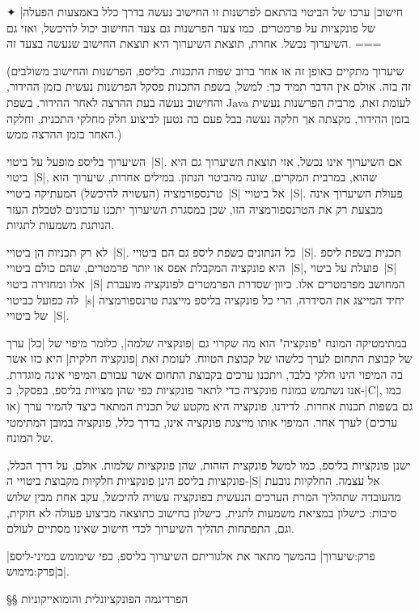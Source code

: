 ✦ \ע|חישוב| ערכו של הביטוי בהתאם לפרשנות זו החישוב נעשה בדרך כלל באמצעות הפעלה
של פונקציות על פרמטרים. כמו צעד הפרשנות גם צעד החישוב יכול להיכשל, ואזי גם
השיערוך נכשל. אחרת, תוצאת השיערוך היא תוצאת החישוב שנעשה בצעד זה.
===

(שיערוך מתקיים באופן זה או אחר ברוב שפות התכנות. בליספ, הפרשנות והחישוב
משולבים זה בזה. אולם אין הדבר תמיד כך: למשל, בשפת התכנות פסקל הפרשנות נעשית
בזמן ההידור, והחישוב נעשה בעת ההרצה לאחר ההידור. בשפת Java לעומת זאת, מרבית
הפרשנות נעשית בזמן ההידור, מקצתה אך חלקה נעשה בבל פעם בה נטען לביצוע חלק מחלקי
התכנית, וחלקה האחר בזמן ההרצה ממש.)

השיערוך בליספ מופעל על ביטוי~\E|S|. אם השיערוך אינו נכשל, אזי תוצאת השיערוך גם
היא ביטוי~\E|S|, שהוא, במרבית המקרים, שונה מהביטוי הנתון. במילים אחרות, שיערוך
הוא טרנספורמציה (העשויה להיכשל) המעתיקה ביטויי~\E|S| אל ביטויי~\E|S|. פעולת
השיערוך אינה מבצעת רק את הטרנספורמציה הזו, שכן במסגרת השיערוך יתכנו עדכונים
לטבלת העזר הנותנת משמעות לתגיות.

לא רק תכניות הן ביטויי~\E|S|. כל הנתונים בשפת ליספ גם הם ביטויי~\E|S|. תכנית
בשפת ליספ היא פונקציה המקבלת אפס או יותר פרמטרים, שהם כולם ביטויי~\E|S|, פועלת
על ביטוי~\E|S| אלו ומחזירה ביטוי~\E|S| המחושב מפרמטרים אלו. כיוון שסדרת
הפרמטרים לפונקציה מועברת לה כפועל כביטוי~\E|s| יחיד המייצג את הסידרה, הרי כל
פונקציה בליספ מייצגת טרנספורמציה של ביטויי~\E|S|.

במתימטיקה המונח "פונקציה" הוא מה שקרוי גם \ע|פונקציה שלמה|, כלומר מיפוי של
\ע|כל| ערך של קבוצת התחום לערך כלשהו של קבוצת הטווח. לעומת זאת \ע|פונקציה
חלקית| היא כזו אשר בה המיפוי הינו חלקי בלבד, ויתכנו ערכים בקבוצת התחום אשר
עבורם המיפוי אינה מוגדרת. אנו נשתמש במונח פונקציה כדי לתאר פונקציות כפי שהן
מצויות בליספ, בפסקל, ב-\E|C|, כמו גם בשפות תכנות אחרות. לדידנו, פונקציה היא
מקטע של תכנית המתאר כיצד להמיר ערך (או ערכים) לערך אחר. המיפוי אותו מייצגת
פונקציה אינו, בדרך כלל, פונקציה במובן המתימטי של המונח.

ישנן פונקציות בליספ, כמו למשל פונקצית הזהות, שהן פונקציות שלמות. אולם, על דרך
הכלל, פונקציות בליספ הינן פונקציות חלקיות מקבוצת ביטויי ה-\E|S| אל עצמה.
החלקיות נובעת מהעובדה שתהליך המרת הערכים הנעשית בפונקציה עשויה להיכשל, עקב אחת
מבין שלוש סיבות: כישלון במציאת משמעות לתגית, כישלון בחישוב כתוצאה מביצוע פעולה
לא חוקית, וגם, התפתחות תהליך השיערוך לכדי חישוב שאינו מסתיים לעולם.

|פרק:שיערוך| בהמשך מתאר את אלגוריתם השיערוך בליספ, כפי שימומש
במיני-ליספ ב|פרק:מימוש|.

§§ הפרדיגמה הפונקציונלית והומואייקוניות

